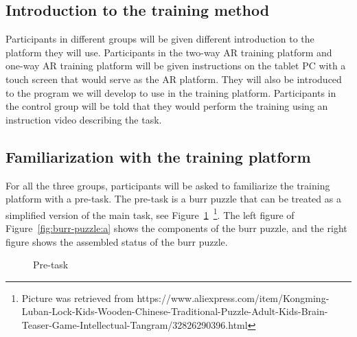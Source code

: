 \subsection{Introduction to the training method}

Participants in different groups will be given different introduction to the platform they will use.
Participants in the two-way AR training platform and one-way AR training platform will be given instructions on the tablet PC with a touch screen that would serve as the AR platform. They will also be introduced to the program we will develop to use in the training platform.
Participants in the control group will be told that they would perform the training using an instruction video describing the task.

\subsection{Familiarization with the training platform}

For all the three groups, participants will be asked to familiarize the training platform with a pre-task. The pre-task is a burr puzzle that can be treated as a simplified version of the main task, see Figure~\ref{fig:burr-puzzle}~\footnote{Picture was retrieved from https://www.aliexpress.com/item/Kongming-Luban-Lock-Kids-Wooden-Chinese-Traditional-Puzzle-Adult-Kids-Brain-Teaser-Game-Intellectual-Tangram/32826290396.html}.
The left figure of Figure~\ref{fig:burr-puzzle:a} shows the components of the burr puzzle, and the right figure shows the assembled status of the burr puzzle.

\begin{figure}
	\centering
	\caption{Pre-task}
	\label{fig:burr-puzzle}
\end{figure}

